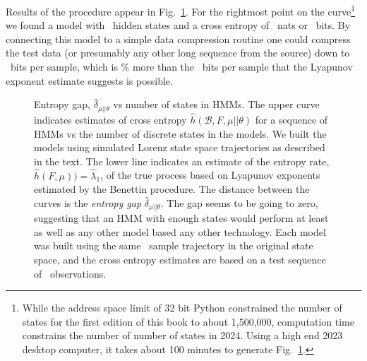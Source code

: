 Results of the procedure appear in Fig.~\ref{fig:LikeLor}.  For the
rightmost point on the curve\footnote{While the address space limit of
  32 bit Python constrained the number of states for the first edition
  of this book to about 1,500,000, computation time constrains the
  number of number of states in 2024.  Using a high end 2023 desktop
  computer, it takes about 100 minutes to generate
  Fig.~\ref{fig:LikeLor}.} we found a model with
%
\toyLikeLornstates~hidden states and a cross entropy of
\toyLikeLorcrossentropy~nats or \toyLikeLorcrossentropybits~bits.  By
connecting this model to a simple data compression routine one could
compress the test data (or presumably any other long sequence from the
source) down to \toyLikeLorcrossentropybits~bits per sample, which is
\toyLikeLorGapPercent\% more than the \toyLikeLorEntropyBits~bits per
sample that the Lyapunov exponent estimate suggests is possible.
\begin{figure}[htbp]
  \caption[Entropy gap,
  $\hat \delta_{\mu||\theta}$, vs number of states in HMMs]%
  {Entropy gap, $\hat \delta_{\mu||\theta}$ vs number of states in
    HMMs.  The upper curve indicates estimates of cross entropy
    $\hat h(\mathcal{B},F,\mu||\theta)$ for a sequence of HMMs vs the
    number of discrete states in the models.  We built the models
    using simulated Lorenz state space trajectories as described in
    the text.  The lower line indicates an estimate of the entropy
    rate, $\hat h(F,\mu)) = \hat \lambda_1$, of the true process based
    on Lyapunov exponents estimated by the Benettin procedure.  The
    distance between the curves is the \emph{entropy gap}
    $\hat \delta_{\mu||\theta}$. The gap seems to be going to zero,
    suggesting that an HMM with enough states would perform at least
    as well as any other model based any other technology.  Each model
    was built using the same \toyLikeLorntrain~sample trajectory in
    the original state space, and the cross entropy estimates are
    based on a test sequence of \toyLikeLorntest~observations.}
  \label{fig:LikeLor}
\end{figure}

